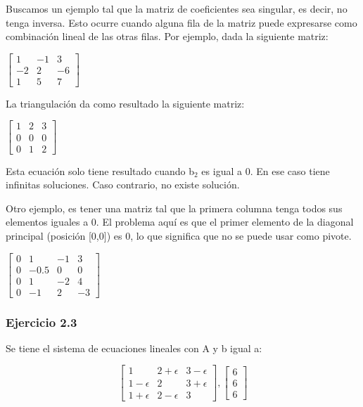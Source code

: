 Buscamos un ejemplo tal que la matriz de coeficientes sea singular, es decir, no tenga inversa. Esto ocurre cuando alguna fila de la matriz puede expresarse como combinación lineal de las otras filas. Por ejemplo, dada la siguiente matriz:

\begin{center}
$\begin{bmatrix}
1 & -1 & 3\\
-2 & 2 & -6\\
1 & 5 & 7
\end{bmatrix}$
\end{center}

La triangulación da como resultado la siguiente matriz:

\begin{center}
$\begin{bmatrix}
1 & 2 & 3\\
0 & 0 & 0\\
0 & 1 & 2
\end{bmatrix}$
\end{center}

Esta ecuación solo tiene resultado cuando b$_2$ es igual a 0. En ese caso tiene infinitas soluciones. Caso contrario, no existe solución.

Otro ejemplo, es tener una matriz tal que la primera columna tenga todos sus elementos iguales a 0. El problema aquí es que el primer elemento de la diagonal principal (posición [0,0]) es 0, lo que significa que no se puede usar como pivote.

\begin{center}
$\begin{bmatrix}
0 & 1 & -1 & 3\\
0 & -0.5 & 0 & 0\\
0 & 1 & -2 & 4\\
0 & -1 & 2 & -3
\end{bmatrix}$
\end{center}

\subsubsection{Ejercicio 2.3}

Se tiene el sistema de ecuaciones lineales con A y b igual a:

\[ \begin{bmatrix}
1 & 2+\epsilon & 3-\epsilon\\
1-\epsilon & 2 & 3+\epsilon\\
1+\epsilon & 2-\epsilon & 3
\end{bmatrix} ,
\begin{bmatrix}
6\\
6\\
6
\end{bmatrix}\]

